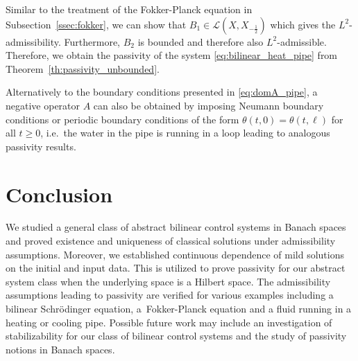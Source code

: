 \documentclass{cocv}
\theoremstyle{definition}
\begin{document}
Similar to the treatment of the Fokker-Planck equation in Subsection~\ref{ssec:fokker}, we can show that $B_1\in\mathcal{L}(X,X_{-\frac12})$ which gives the $L^2$-admissibility. Furthermore, $B_2$ is bounded and therefore also $L^2$-admissible. Therefore, we obtain the passivity of the system \eqref{eq:bilinear_heat_pipe} from Theorem~\ref{th:passivity_unbounded}.

Alternatively to the boundary conditions presented in \eqref{eq:domA_pipe}, a negative operator $A$ can also be obtained by imposing Neumann boundary conditions or periodic boundary conditions of the form $\theta(t,0)=\theta(t,\ell)$ for all $t\geq 0$, i.e.\ the water in the pipe is running in a loop leading to analogous passivity results. 

\section{Conclusion}
\label{sec:conclusion}

We studied a general class of abstract bilinear control systems in Banach
spaces and proved existence and uniqueness of classical solutions under
admissibility assumptions. Moreover, we established continuous dependence of
mild solutions on the initial and input data. This is utilized to prove passivity for our abstract system class when the underlying space is a  Hilbert space. The admissibility assumptions leading to passivity are verified for various examples including a bilinear Schrödinger equation, a~Fokker-Planck equation and a fluid running in a heating or cooling pipe.
Possible future work may include an investigation of stabilizability for our class of bilinear control systems and the study of passivity notions in Banach spaces. 






\end{document}
